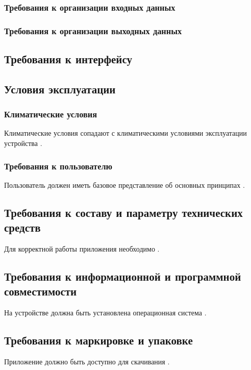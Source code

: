 \documentclass[a4paper,12pt,reqno]{article}
\begin{document}
	{\color{red}{TODO}}
	\subsubsection{Требования к организации входных данных}
	{\color{red}{TODO}}
	\subsubsection{Требования к организации выходных данных}
	{\color{red}{TODO}}
	\clearpage
	\subsection{Требования к интерфейсу}
	{\color{red}{TODO}}
	\subsection{Условия эксплуатации}
	\subsubsection{Климатические условия}
	Климатические условия сопадают с климатическими условиями эксплуатации\\ устройства \cite{terms}.
	\subsubsection{Требования к пользователю}
	Пользователь должен иметь базовое представление об основных принципах {\color{red}{TODO}}.
	\subsection{Требования к составу и параметру технических средств}
	Для корректной работы приложения необходимо {\color{red}{TODO}}.
	\subsection{Требования к информационной и программной совместимости}
	На устройстве должна быть установлена операционная система {\color{red}{TODO}}.
	\subsection{Требования к маркировке и упаковке}
	Приложение должно быть доступно для скачивания {\color{red}{TODO}}.
	
\end{document}
